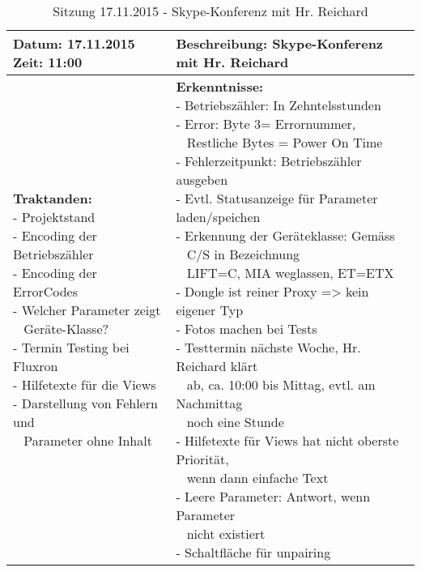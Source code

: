 \begin{table}[H]
\begin{tabularx}{\textwidth}{| l | X |}
\hline
\textbf{Datum:} 17.11.2015
\textbf{Zeit:} 11:00
&
\textbf{Beschreibung:} Skype-Konferenz mit Hr. Reichard \\ \hline
\specialcell[t]{
\textbf{Traktanden:}\\
- Projektstand\\
- Encoding der Betriebszähler\\
- Encoding der ErrorCodes\\
- Welcher Parameter zeigt\\~ Geräte-Klasse?\\
- Termin Testing bei Fluxron\\
- Hilfetexte für die Views\\
- Darstellung von Fehlern und\\~ Parameter ohne Inhalt\\
}
& 
\specialcell[t]{
\textbf{Erkenntnisse:}\\
- Betriebszähler: In Zehntelsstunden\\
- Error: Byte 3= Errornummer,\\~ Restliche Bytes = Power On Time\\
- Fehlerzeitpunkt: Betriebszähler ausgeben\\
- Evtl. Statusanzeige für Parameter laden/speichen\\
- Erkennung der Geräteklasse: Gemäss\\~ C/S in Bezeichnung\\~ LIFT=C, MIA weglassen, ET=ETX\\
- Dongle ist reiner Proxy => kein eigener Typ\\
- Fotos machen bei Tests\\
- Testtermin nächste Woche, Hr. Reichard klärt\\~ ab, ca. 10:00 bis Mittag, evtl. am Nachmittag\\~ noch eine Stunde\\
- Hilfetexte für Views hat nicht oberste Priorität,\\~ wenn dann einfache Text\\
- Leere Parameter: Antwort, wenn Parameter\\~ nicht existiert\\
- Schaltfläche für unpairing\\
}
\\ \hline
\end{tabularx}
\caption{Sitzung 17.11.2015 - Skype-Konferenz mit Hr. Reichard}
\end{table}



